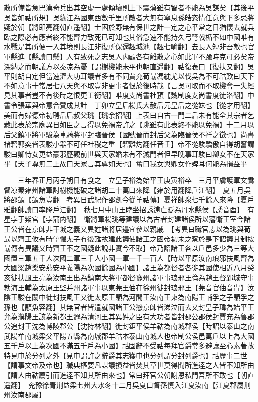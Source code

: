 散所備皆急巴漢奇兵出其空虚一處傾壞則上下震蕩雖有智者不能為吳謀矣【其後平吳皆如祜所規】吳緣江為國東西數千里所敵者大無有寧息孫皓恣情任意與下多忌將疑於朝【將即亮翻朝直遥翻】士困於野無有保世之計一定之心平常之日猶懷去就兵臨之際必有應者終不能齊力致死已可知也其俗急速不能持久弓弩戟楯不如中國唯有水戰是其所便一入其境則長江非復所保還趣城池【趣七喻翻】去長入短非吾敵也官軍縣進【縣讀曰懸】人有致死之志吳人内顧各有離散之心如此軍不踰時克可必矣帝深納之而朝議方以秦凉為憂【謂樹機能未平也朝直遥翻】祜復表曰【復扶又翻】吳平則胡自定但當速濟大功耳議者多有不同賈充荀朂馮紞尤以伐吳為不可祜歎曰天下不如意事十常居七八天與不取豈非更事者恨於後時哉【言吳可取而不取機會一失經見其事者豈不有後時之恨更工衡翻】唯度支尚書杜預【魏制度支尚書度徒洛翻】中書令張華與帝意合贊成其計　丁卯立皇后楊氏大赦后元皇后之從妹也【從才用翻】美而有婦德帝初聘后后叔父珧【珧余招翻】上表曰自古一門二后未有能全其宗者乞藏此表於宗廟異日如臣之言得以免禍帝許之【珧雖有此表終不能以免禍】十二月以后父鎮軍將軍駿為車騎將軍封臨晉侯【國號晉而封后父為臨晉侯不祥之徵也】尚書禇䂮郭奕皆表駿小器不可任社稷之重【䂮離灼翻任音壬】帝不從駿驕傲自得胡奮謂駿曰卿恃女更益豪邪歷觀前世與天家婚未有不滅門者但早晩事耳駿曰卿女不在天家乎【天子尊無二上故曰天家言其尊如天也】奮曰我女與卿女作婢耳何能為損益乎

　　三年春正月丙子朔日有食之　立皇子裕為始平王庚寅裕卒　三月平虜護軍文鴦督凉秦雍州諸軍討樹機能破之諸胡二十萬口來降【雍於用翻降戶江翻】　夏五月吳將邵顗【顗魚豈翻　考異日武紀作邵凱今從羊祜傳】夏祥帥衆七千餘人來降【夏戶雅翻帥讀曰率降戶江翻】　秋七月中山王睦坐招誘逋亡貶為丹水縣侯【誘音酉】　有星孛于紫宫【孛蒲内翻】　衛將軍楊珧等建議以為古者封建諸侯所以藩衛王室今諸王公皆在京師非干城之義又異姓諸將居邉宜參以親戚　【考異曰職官志以為珧與荀朂以齊王攸有時望懼太子冇後難故建此議使諸王之國帝初未之察於是下詔議其制按朂傳有異議又時齊王不之國疑此說非實今不取】帝乃詔諸王各以戶邑多少為三等大國置三軍五千人次國二軍三千人小國一軍一千一百人【時以平原汝南琅邪扶風齊為大國梁趙樂安燕安平義陽為次國餘國為小國】諸王為都督者各徙其國使相近八月癸亥徙扶風王亮為汝南王出為鎮南大將軍都督豫州諸軍事琅邪王倫為趙王督鄴城守事勃海王輔為太原王監并州諸軍事以東莞王伷在徐州徙封琅邪王【莞音官伷音胄】汝陰王駿在關中徙封扶風王又徙太原王顒為河間王汝南王柬為南陽王輔孚之子顒孚之孫也【顒魚容翻】其無官者皆遣就國諸王公戀京師皆涕泣而去又封皇子瑋為始平王允為濮陽王該為新都王遐為清河王其異姓之臣有大功者皆封郡公郡侯封賈充為魯郡公追封王沈為博陵郡公【沈持林翻】徙封鉅平侯羊祜為南城郡侯【時詔以泰山之南武陽牟南城梁父平陽五縣為南城郡羊祜本泰山南城人也帝制公侯邑萬戶以上為大國五千戶以上為次國不滿五千戶為小國】祜固辭不受祜每拜官爵常多避讓至心素著故特見申於分列之外【見申謂許之辭爵其志獲申也分列謂分封列爵也】祜歷事二世【謂事文帝及帝也】職典樞要凡謀議損益皆焚其草世莫得聞所進逹之人皆不知所由【謂人由祜薦引而進逹不知其所由來也】常曰拜官公朝謝恩私門吾所不敢也【朝直遥翻】　兖豫徐青荆益梁七州大水冬十二月吳夏口督孫慎入江夏汝南【江夏郡屬荆州汝南郡屬】

